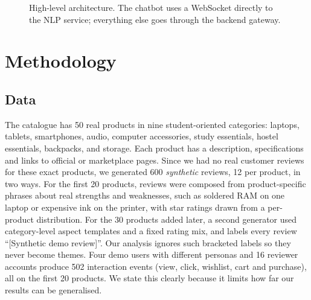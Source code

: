 \documentclass[conference]{IEEEtran}
\begin{document}
\begin{figure}[t]
\centering
{}
\caption{High-level architecture. The chatbot uses a WebSocket directly to the NLP service; everything else goes through the backend gateway.}
\label{fig:arch}
\end{figure}

\section{Methodology}

\subsection{Data}
The catalogue has 50 real products in nine student-oriented categories: laptops, tablets, smartphones, audio, computer accessories, study essentials, hostel essentials, backpacks, and storage. Each product has a description, specifications and links to official or marketplace pages. Since we had no real customer reviews for these exact products, we generated 600 \emph{synthetic} reviews, 12 per product, in two ways. For the first 20 products, reviews were composed from product-specific phrases about real strengths and weaknesses, such as soldered RAM on one laptop or expensive ink on the printer, with star ratings drawn from a per-product distribution. For the 30 products added later, a second generator used category-level aspect templates and a fixed rating mix, and labels every review ``[Synthetic demo review]''. Our analysis ignores such bracketed labels so they never become themes. Four demo users with different personas and 16 reviewer accounts produce 502 interaction events (view, click, wishlist, cart and purchase), all on the first 20 products. We state this clearly because it limits how far our results can be generalised.
\end{document}
